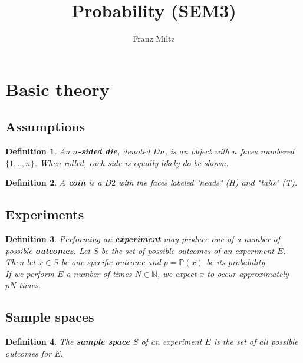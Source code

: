 \documentclass{article}
\theoremstyle{sltheorem}
\newtheorem{definition}{Definition}[section]
\newcommand{\N}{\mathbb{N}}
\renewcommand{\P}{\mathbb{P}}
\newcommand*\B[1]{\textbf{#1}}
\begin{document}
\title{Probability (SEM3)}
\author{Franz Miltz}
\maketitle
\tableofcontents
\section{Basic theory}
\subsection{Assumptions}
\begin{definition}
    An \B{$n$-sided die}, denoted $Dn$, is an object with $n$ faces numbered $\{1,..,n\}$.
    When rolled, each side is equally likely do be shown.
\end{definition}
\begin{definition}
    A \B{coin} is a $D2$ with the faces labeled "heads" (H) and "tails" (T).
\end{definition}
\subsection{Experiments}
\begin{definition}
    Performing an \B{experiment} may produce one of a number of possible \B{outcomes}.
    Let $S$ be the set of possible outcomes of an experiment $E$. Then let $x\in S$ be one specific outcome and
    $p=\P(x)$ be its probability.\\
    If we perform $E$ a number of times $N\in\N$, we expect $x$ to occur approximately $pN$ times.
\end{definition}
\subsection{Sample spaces}
\begin{definition}
    The \textbf{sample space $S$} of an experiment $E$ is the set of all possible outcomes for $E$.
\end{definition}
\end{document}

